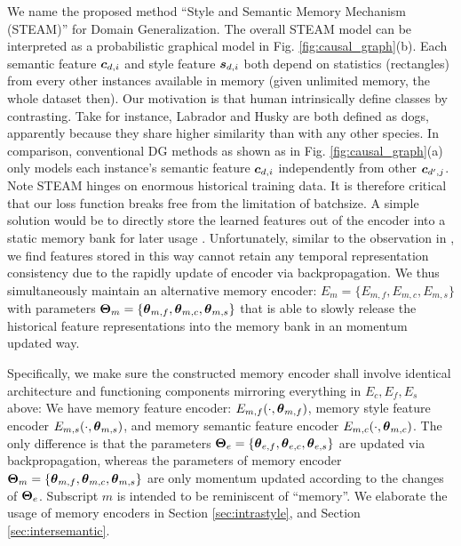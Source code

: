 \documentclass[10pt,twocolumn,letterpaper]{article}
\newcommand{\bc}{\mbox{\boldmath $c$}}
\newcommand{\bs}{\mbox{\boldmath $s$}}
\newcommand{\btheta}{\mbox{\boldmath $\theta$}}
\newcommand{\bTheta}{\mbox{\boldmath $\Theta$}}
\newcommand{\0}{{\bf 0}}
\begin{document}
We name the proposed method ``Style and Semantic Memory Mechanism (STEAM)'' for Domain Generalization. The overall STEAM model can be interpreted as a probabilistic graphical model in Fig. \ref{fig:causal_graph}(b). Each semantic feature $\bc_{d,i}$ and style feature $\bs_{d,i}$ both depend on statistics (rectangles) from every other instances available in memory (given unlimited memory, the whole dataset then). Our motivation is that human intrinsically define classes by contrasting. Take for instance, Labrador and Husky are both defined as dogs, apparently because they share higher similarity than with any other species. In comparison, conventional DG methods as shown as in Fig. \ref{fig:causal_graph}(a) only models each instance's semantic feature $\bc_{d,i}$ independently from other $\bc_{d',j}$. Note STEAM hinges on enormous historical training data. It is therefore critical that our loss function breaks free from the limitation of batchsize. A simple solution would be to directly store the learned features out of the encoder into a static memory bank for later usage \cite{wu2018unsupervised}. Unfortunately, similar to the observation in \cite{he2020momentum}, we find features stored in this way cannot retain any temporal representation consistency due to the rapidly update of encoder via backpropagation. We thus simultaneously maintain an alternative memory encoder: $E_m=\{E_{m,f}, E_{m,c}, E_{m,s}\}$ with parameters $\bTheta_{m}=\{\btheta_{m, f},\btheta_{m, c},\btheta_{m, s}\}$ that is able to slowly release the historical feature representations into the memory bank in an momentum updated way.

Specifically, we make sure the constructed memory encoder shall involve identical architecture and functioning components mirroring everything in $E_{c}, E_{f}, E_{s}$ above: We have memory feature encoder: $E_{m,f}(\cdot, \btheta_{m, f})$, memory style feature encoder $E_{m, s}(\cdot, \btheta_{m, s})$, and memory semantic feature encoder $E_{m,c}(\cdot, \btheta_{m, c})$. The only difference is that the parameters $\bTheta_{e}=\{\btheta_{e, f},\btheta_{e, c},\btheta_{e, s}\}$  are updated via backpropagation, whereas the parameters of memory encoder $\bTheta_{m}=\{\btheta_{m, f},\btheta_{m, c},\btheta_{m, s}\}$ are only momentum updated according to the changes of $\bTheta_e$. Subscript $m$ is intended to be reminiscent of ``memory''. We elaborate the usage of memory encoders in Section \ref{sec:intrastyle}, and Section \ref{sec:intersemantic}.
\end{document}
